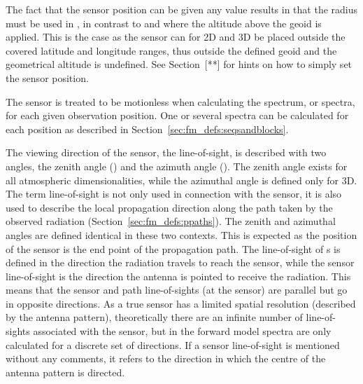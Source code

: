 The fact that the sensor position can be given any value results in
that the radius must be used in , in contrast
to  and  where the altitude
above the geoid is applied. This is the case as the sensor can for 2D
and 3D be placed outside the covered latitude and longitude ranges,
thus outside the defined geoid and the geometrical altitude is
undefined. See Section~[**] for hints on how to simply set the sensor
position.

The sensor is treated to be motionless when calculating the spectrum,
or spectra, for each given observation position. One or several
spectra can be calculated for each position as described in
Section~\ref{sec:fm_defs:seqsandblocks}.


\label{sec:fm_defs:los}

The viewing direction of the sensor, the line-of-sight, is described
with two angles, the zenith angle (\ZntAng) and the azimuth angle
(\AzmAng). The zenith angle exists for all atmospheric
dimensionalities, while the azimuthal angle is defined only for 3D.
The term line-of-sight is not only used in connection with the sensor,
it is also used to describe the local propagation direction along the
path taken by the observed radiation
(Section~\ref{sec:fm_defs:ppaths}).  The zenith and azimuthal angles
are defined identical in these two contexts. This is expected as the
position of the sensor is the end point of the propagation path. The
line-of-sight of s is defined in the
direction the radiation travels to reach the sensor, while the sensor
line-of-sight is the direction the antenna is pointed to receive the
radiation. This means that the sensor and path line-of-sights (at the
sensor) are parallel but go in opposite directions. As a true sensor
has a limited spatial resolution (described by the antenna pattern),
theoretically there are an infinite number of line-of-sights
associated with the sensor, but in the forward model spectra are only
calculated for a discrete set of directions. If a sensor line-of-sight
is mentioned without any comments, it refers to the direction in which
the centre of the antenna pattern is directed.

